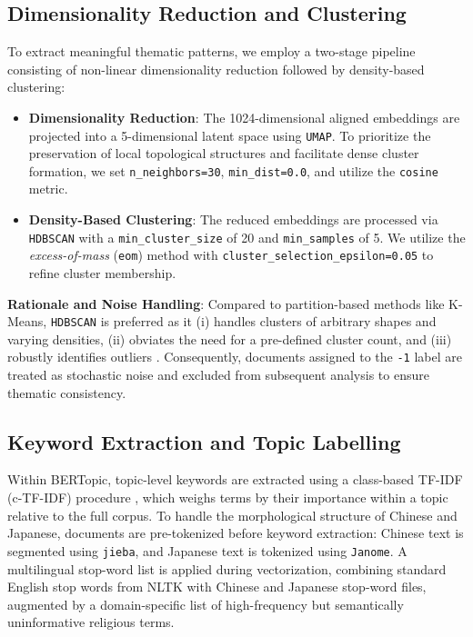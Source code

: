 \documentclass[../CLthesis.tex]{subfiles}
\begin{document}
\subsection{Dimensionality Reduction and Clustering}

To extract meaningful thematic patterns, we employ a two-stage pipeline consisting of non-linear dimensionality reduction followed by density-based clustering:

\begin{itemize}
    \item \textbf{Dimensionality Reduction}: The 1024-dimensional aligned embeddings are projected into a 5-dimensional latent space using \texttt{UMAP}. To prioritize the preservation of local topological structures and facilitate dense cluster formation, we set \texttt{n\_neighbors=30}, \texttt{min\_dist=0.0}, and utilize the \texttt{cosine} metric.
    
    \item \textbf{Density-Based Clustering}: The reduced embeddings are processed via \texttt{HDBSCAN} with a \texttt{min\_cluster\_size} of 20 and \texttt{min\_samples} of 5. We utilize the \textit{excess-of-mass} (\texttt{eom}) method with \texttt{cluster\_selection\_epsilon=0.05} to refine cluster membership.
\end{itemize}

\noindent \textbf{Rationale and Noise Handling}: Compared to partition-based methods like K-Means, \texttt{HDBSCAN} is preferred as it (i) handles clusters of arbitrary shapes and varying densities, (ii) obviates the need for a pre-defined cluster count, and (iii) robustly identifies outliers \citep{campello_density-based_2013}. Consequently, documents assigned to the \texttt{-1} label are treated as stochastic noise and excluded from subsequent analysis to ensure thematic consistency.

\subsection{Keyword Extraction and Topic Labelling}

Within BERTopic, topic-level keywords are extracted using a class-based TF-IDF (c-TF-IDF) procedure \citep{grootendorst_bertopic_2022}, which weighs terms by their importance within a topic relative to the full corpus. To handle the morphological structure of Chinese and Japanese, documents are pre-tokenized before keyword extraction: Chinese text is segmented using \texttt{jieba}, and Japanese text is tokenized using \texttt{Janome}. A multilingual stop-word list is applied during vectorization, combining standard English stop words from NLTK with Chinese and Japanese stop-word files, augmented by a domain-specific list of high-frequency but semantically uninformative religious terms.
\end{document}
